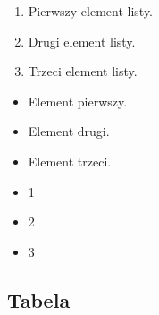\begin{enumerate}
    \item Pierwszy element listy.
    \item Drugi element listy.
    \item Trzeci element listy.
\end{enumerate}

\begin{itemize}
    \item Element pierwszy.
    \item Element drugi.
    \item Element trzeci.
\end{itemize}

\begin{itemize}
    \item[] 1
    \item[] 2
    \item[] 3
\end{itemize}

\subsection{Tabela}
